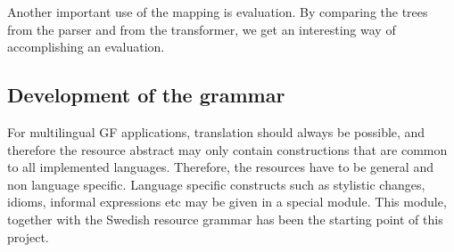 \documentclass[submission]{eptcs} %
\begin{document}
Another important use of the mapping is evaluation. By comparing the trees
from the parser and from the transformer, we get an interesting way of
accomplishing an evaluation.


\subsection{Development of the grammar}

For multilingual GF applications, translation should always be possible, and
therefore the resource abstract may only contain constructions that
are common to all implemented languages.
Therefore, the resources have to be general and non language specific.
Language specific constructs such as stylistic changes, idioms, informal
expressions etc may be given in a special module.
This module, together with the Swedish resource grammar has been the starting
point of this project.
\end{document}
